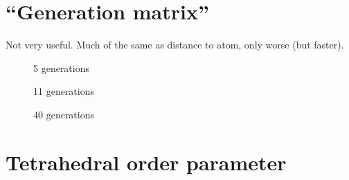 \FloatBarrier
\section{``Generation matrix''}
Not very useful. Much of the same as distance to atom, only worse (but faster).
%
\begin{figure}[htpb]%
    \centering%
    \caption{5 generations}%
    \label{fig:generation_matrix_r05}%
\end{figure}%
%
\begin{figure}[htpb]%
    \centering%
    \caption{11 generations}%
    \label{fig:generation_matrix_r11}%
\end{figure}%
%
\begin{figure}[htpb]%
    \centering%
    \caption{40 generations}%
    \label{fig:generation_matrix_r40}%
\end{figure}%

\FloatBarrier
\section{Tetrahedral order parameter}



